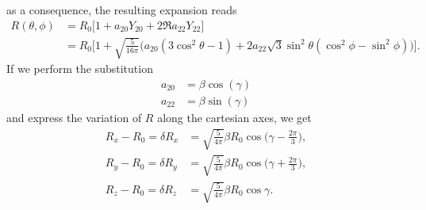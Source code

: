 as a consequence, the resulting expansion reads
\begin{align}
    R(\theta, \phi) &= R_0\bigg[1+a_{20}Y_{20}+2\Re{a_{22}Y_{22}}\bigg]
    \\&=R_0\bigg[1+\sqrt{\frac{5}{16\pi}}\bigg(a_{20}(3\cos^2\theta-1)+ 2a_{22}\sqrt{3}\sin^2\theta(\cos^2\phi-\sin^2\phi) \bigg)\bigg].
\end{align}
If we perform the substitution 
\begin{align}
    \label{eq:a20}
    a_{20} &= \beta\cos(\gamma)
    \\  a_{22} &= \beta\sin(\gamma)\label{eq:a22}
\end{align} 
and express the variation of $R$ along the cartesian axes, we get 
\begin{align}
     R_x - R_0  =\delta R_{x}&=\sqrt{\frac{5}{4\pi}}\beta R_0 \cos\bigg(\gamma - \frac{2\pi}{3}\bigg),
    \\R_y - R_0 =\delta R_{y}&=\sqrt{\frac{5}{4\pi}}\beta R_0 \cos\bigg(\gamma + \frac{2\pi}{3}\bigg),
    \\R_z - R_0 =\delta R_{z}&=\sqrt{\frac{5}{4\pi}}\beta R_0 \cos\gamma.
\end{align}

